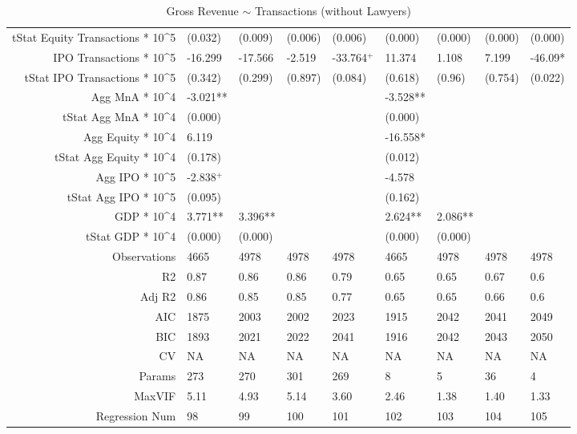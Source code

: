 \begin{table}[ht]
\begin{tabular}{rllllllll}
  tStat Equity Transactions * 10^5 & (0.032) & (0.009) & (0.006) & (0.006) & (0.000) & (0.000) & (0.000) & (0.000) \\ 
  IPO Transactions * 10^5 & -16.299 & -17.566 & -2.519 & -33.764$^{+}$ & 11.374 & 1.108 & 7.199 & -46.09* \\ 
  tStat IPO Transactions * 10^5 & (0.342) & (0.299) & (0.897) & (0.084) & (0.618) & (0.96) & (0.754) & (0.022) \\ 
  Agg MnA * 10^4 & -3.021** &  &  &  & -3.528** &  &  &  \\ 
  tStat Agg MnA * 10^4 & (0.000) &  &  &  & (0.000) &  &  &  \\ 
  Agg Equity * 10^4 & 6.119 &  &  &  & -16.558* &  &  &  \\ 
  tStat Agg Equity * 10^4 & (0.178) &  &  &  & (0.012) &  &  &  \\ 
  Agg IPO * 10^5 & -2.838$^{+}$ &  &  &  & -4.578 &  &  &  \\ 
  tStat Agg IPO * 10^5 & (0.095) &  &  &  & (0.162) &  &  &  \\ 
  GDP * 10^4 & 3.771** & 3.396** &  &  & 2.624** & 2.086** &  &  \\ 
  tStat GDP * 10^4 & (0.000) & (0.000) &  &  & (0.000) & (0.000) &  &  \\ 
  Observations & 4665 & 4978 & 4978 & 4978 & 4665 & 4978 & 4978 & 4978 \\ 
  R2 & 0.87 & 0.86 & 0.86 & 0.79 & 0.65 & 0.65 & 0.67 & 0.6 \\ 
  Adj R2 & 0.86 & 0.85 & 0.85 & 0.77 & 0.65 & 0.65 & 0.66 & 0.6 \\ 
  AIC & 1875 & 2003 & 2002 & 2023 & 1915 & 2042 & 2041 & 2049 \\ 
  BIC & 1893 & 2021 & 2022 & 2041 & 1916 & 2042 & 2043 & 2050 \\ 
  CV & NA & NA & NA & NA & NA & NA & NA & NA \\ 
  Params & 273 & 270 & 301 & 269 & 8 & 5 & 36 & 4 \\ 
  MaxVIF & 5.11 & 4.93 & 5.14 & 3.60 & 2.46 & 1.38 & 1.40 & 1.33 \\ 
  Regression Num & 98 & 99 & 100 & 101 & 102 & 103 & 104 & 105 \\ 
   \hline
\end{tabular}
\caption{Gross Revenue $\sim$ Transactions (without Lawyers)} 
\end{table}
